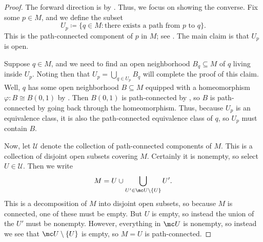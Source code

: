 \documentclass[../notes.tex]{subfiles}
\begin{document}
\begin{proof}
	The forward direction is by . Thus, we focus on showing the converse. Fix some $p\in M$, and we define the subset
	\[U_p\coloneqq\{q\in M:\text{there exists a path from }p\text{ to }q\}.\]
	This is the path-connected component of $p$ in $M$; see \cite[Definition~A.19]{elber-top}. The main claim is that $U_p$ is open.
	
	Suppose $q\in M$, and we need to find an open neighborhood $B_q\subseteq M$ of $q$ living inside $U_p$. Noting then that $U_p=\bigcup_{q\in U_p}B_q$ will complete the proof of this claim. Well, $q$ has some open neighborhood $B\subseteq M$ equipped with a homeomorphism $\varphi\colon B\cong B(0,1)$ by . Then $B(0,1)$ is path-connected by , so $B$ is path-connected by going back through the homeomorphism. Thus, because $U_p$ is an equivalence class, it is also the path-connected equivalence class of $q$, so $U_p$ must contain $B$.

	Now, let $\mathcal U$ denote the collection of path-connected components of $M$. This is a collection of disjoint open subsets covering $M$. Certainly it is nonempty, so select $U\in\mathcal U$. Then we write
	\[M=U\cup\bigcup_{U'\in\mc U\setminus\{U\}}U'.\]
	This is a decomposition of $M$ into disjoint open subsets, so because $M$ is connected, one of these must be empty. But $U$ is empty, so instead the union of the $U'$ must be nonempty. However, everything in $\mc U$ is nonempty, so instead we see that $\mc U\setminus\{U\}$ is empty, so $M=U$ is path-connected.
\end{proof}
\end{document}
